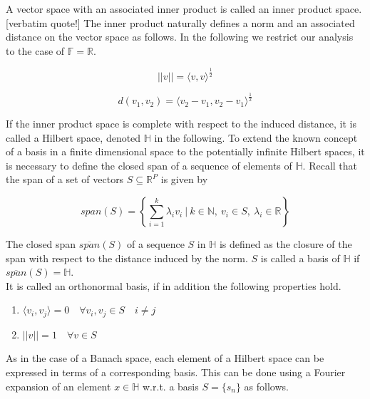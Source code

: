 \documentclass[11pt,twoside,a4paper]{article}
\begin{document}
	A vector space with an associated inner product is called an inner product space. {\color{red}[verbatim quote!]}
	The inner product naturally defines a norm and an associated distance on the vector space as follows. In the following we restrict our analysis to the case of $\mathbb{F} = \mathbb{R}$.
	
	\begin{equation}
		\lvert \lvert v \rvert \rvert = {\langle v, v \rangle}^{\frac{1}{2}}
	\end{equation}

	\begin{equation}
		d(v_1, v_2) = {\langle v_2 - v_1, v_2 - v_1 \rangle}^{\frac{1}{2}}
	\end{equation}
	
	If the inner product space is complete with respect to the induced distance, it is called a Hilbert space, denoted $\mathbb{H}$ in the following. To extend the known concept of a basis in a finite dimensional space to the potentially infinite Hilbert spaces, it is necessary to define the closed span of a sequence of elements of $\mathbb{H}$. Recall that the span of a set of vectors $S \subseteq \mathbb{R}^P$ is given by
	
	\begin{equation}
		span(S) = \left\{\sum_{i = 1}^{k} \lambda_i v_i \: \bigg\vert \: k \in \mathbb{N}, \: v_i \in S, \: \lambda_i \in \mathbb{R} \right\}
	\end{equation}
			
	The closed span $\overline{span}(S)$ of a sequence $S$ in $\mathbb{H}$ is defined as the closure of the span with respect to the distance induced by the norm. $S$ is called a basis of $\mathbb{H}$ if $\overline{span}(S) = \mathbb{H}$. \\
	It is called an orthonormal basis, if in addition the following properties hold. 
	
	\begin{multicols}{2}
		\begin{enumerate}
			\item $\langle v_i, v_j \rangle = 0 \quad \forall v_i, v_j \in S \quad i \neq j$
			\item $\lvert \lvert v \rvert \rvert = 1 \quad \forall v \in S$
		\end{enumerate}
	\end{multicols}

	As in the case of a Banach space, each element of a Hilbert space can be expressed in terms of a corresponding basis. This can be done using a Fourier expansion of an element $x \in \mathbb{H}$ w.r.t. a basis $S = \{s_n\}$ as follows.
	
\end{document}

